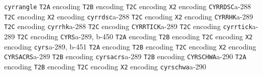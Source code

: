 \documentclass[twoside]{ltxdoc}
\makeatletter
\renewenvironment{theindex}{%
   \@restonecoltrue
   \if@twocolumn\@restonecolfalse\fi
   \columnseprule \z@
   \columnsep 35\p@
   \twocolumn[\index@prologue]%
   \IndexParms
   \let\item\@idxitem
   \ignorespaces
}{\if@restonecol\onecolumn\else\clearpage\fi}
\makeatother
\begin{document}
\begin{theindex}
  \item \texttt  {cyrrangle}\efill 
    \subitem \texttt  {T2A} encoding\pfill {}
    \subitem \texttt  {T2B} encoding\pfill {}
    \subitem \texttt  {T2C} encoding\pfill {}
    \subitem \texttt  {X2} encoding\pfill {}
  \item \texttt  {CYRRDSC}\pfill a-288
    \subitem \texttt  {T2C} encoding\pfill {}
    \subitem \texttt  {X2} encoding\pfill {}
  \item \texttt  {cyrrdsc}\pfill a-288
    \subitem \texttt  {T2C} encoding\pfill {}
    \subitem \texttt  {X2} encoding\pfill {}
  \item \texttt  {CYRRHK}\pfill a-289
    \subitem \texttt  {T2C} encoding\pfill {}
  \item \texttt  {cyrrhk}\pfill a-288
    \subitem \texttt  {T2C} encoding\pfill {}
  \item \texttt  {CYRRTICK}\pfill a-289
    \subitem \texttt  {T2C} encoding\pfill {}
  \item \texttt  {cyrrtick}\pfill a-289
    \subitem \texttt  {T2C} encoding\pfill {}
  \item \texttt  {CYRS}\pfill a-289, b-450
    \subitem \texttt  {T2A} encoding\pfill {}
    \subitem \texttt  {T2B} encoding\pfill {}
    \subitem \texttt  {T2C} encoding\pfill {}
    \subitem \texttt  {X2} encoding\pfill {}
  \item \texttt  {cyrs}\pfill a-289, b-451
    \subitem \texttt  {T2A} encoding\pfill {}
    \subitem \texttt  {T2B} encoding\pfill {}
    \subitem \texttt  {T2C} encoding\pfill {}
    \subitem \texttt  {X2} encoding\pfill {}
  \item \texttt  {CYRSACRS}\pfill a-289
    \subitem \texttt  {T2B} encoding\pfill {}
  \item \texttt  {cyrsacrs}\pfill a-289
    \subitem \texttt  {T2B} encoding\pfill {}
  \item \texttt  {CYRSCHWA}\pfill a-290
    \subitem \texttt  {T2A} encoding\pfill {}
    \subitem \texttt  {T2B} encoding\pfill {}
    \subitem \texttt  {T2C} encoding\pfill {}
    \subitem \texttt  {X2} encoding\pfill {}
  \item \texttt  {cyrschwa}\pfill a-290

\end{theindex}
\end{document}
